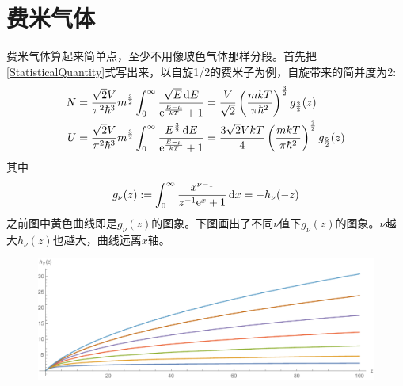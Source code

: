 \documentclass[draft]{article}
\begin{document}
	\section{费米气体}
	费米气体算起来简单点，至少不用像玻色气体那样分段。首先把\eqref{StatisticalQuantity}式写出来，以自旋1/2的费米子为例，自旋带来的简并度为2:
	\begin{subequations}\label{24}\begin{align}
		N&=\frac{\sqrt{2}V}{\pi^2\hbar^3}m^{\frac{3}{2}}\int_0^\infty\frac{\sqrt{E}\mathop{}\!\mathrm{d} E}{\mathrm{e}^{\frac{E-\mu}{kT}}+1}=\frac{V}{\sqrt{2}}\left(\frac{mkT}{\pi\hbar^2}\right)^{\frac{3}{2}}g_{\frac 32}(z)\label{24a}\\
		U&=\frac{\sqrt{2}V}{\pi^2\hbar^3}m^{\frac{3}{2}}\int_0^\infty\frac{E^{\frac 32}\mathop{}\!\mathrm{d} E}{\mathrm{e}^{\frac{E-\mu}{kT}}+1}=\frac{3\sqrt{2}VkT}{4}\left(\frac{mkT}{\pi\hbar^2}\right)^{\frac 32}g_{\frac 52}(z)
	\end{align}\end{subequations}
	其中
	\[g_\nu(z):=\int_0^\infty\frac{x^{\nu-1}}{z^{-1}\mathrm{e}^x+1}\mathop{}\!\mathrm{d} x=-h_\nu(-z)\]
	之前图中黄色曲线即是$ g_\nu(z) $的图象。下图画出了不同$ \nu $值下$ g_\nu(z) $的图象。$ \nu $越大$ h_\nu(z) $也越大，曲线远离$ x $轴。
	\begin{figure}[h]
		\includegraphics[width=\linewidth]{fig2}
	\end{figure}
	
\end{document}
